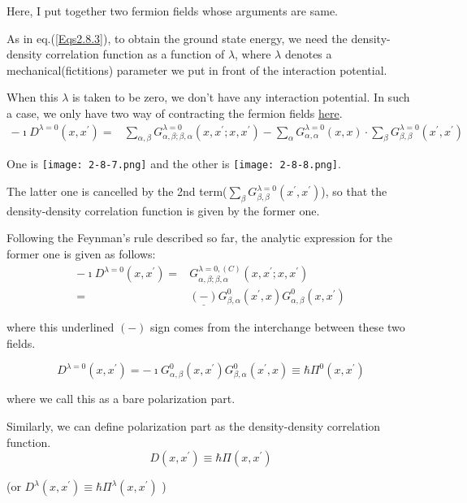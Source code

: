Here, I put together two fermion fields whose arguments are same.

As in eq.(\ref{Eqs2.8.3}), to obtain the ground state energy, we need the density-density correlation function as a function of $\lambda$, where $\lambda$ denotes a mechanical(fictitions) parameter we put in front of the interaction potential.

When this $\lambda$ is taken to be zero, we don't have any interaction potential. In such a case, we only have two way of contracting the fermion fields \underline{here}.
\[\begin{split}
-\imath D^{\lambda=0}(x,x^{'})=& \sum_{\alpha,\beta} G^{\lambda=0}_{\alpha,\beta;\beta,\alpha}(x,x^{'};x,x^{'}) - \sum_{\alpha}G^{\lambda=0}_{\alpha,\alpha}(x,x)\cdot\sum_{\beta}G^{\lambda=0}_{\beta,\beta}(x^{'},x^{'})
\end{split}\]

One is {\label{Fig2.8.7} \texttt{[image: 2-8-7.png]}} and the other is {\label{Fig2.8.8} \texttt{[image: 2-8-8.png]}}.

The latter one is cancelled by the 2nd term($\sum_{\beta} G^{\lambda=0}_{\beta,\beta}(x^{'},x^{'})$), so that the density-density correlation function is given by the former one.

Following the Feynman's rule described so far, the analytic expression for the former one is given as follows:
\[\begin{split}-\imath D^{\lambda=0}(x,x^{'})=&G^{\lambda=0,(C)}_{\alpha,\beta;\beta,\alpha}(x,x^{'};x,x^{'})\\
=& \underline{(-)} G^0_{\beta,\alpha}(x^{'},x) G^0_{\alpha,\beta}(x,x^{'})\end{split}\]

where this underlined $(-)$ sign comes from the interchange between these two fields.

\[D^{\lambda=0}(x,x^{'})=-\imath G^0_{\alpha,\beta}(x,x^{'}) G^0_{\beta,\alpha}(x^{'},x) \equiv \hbar \Pi^0(x,x^{'})\]

where we call this as a bare polarization part.

Similarly, we can define polarization part as the density-density correlation function.
\begin{equation*} \label{Eqs2.8.4'} \tag{2.8.4'}
D(x,x^{'}) \equiv \hbar \Pi(x,x^{'})
\end{equation*}

(or $D^{\lambda}(x,x^{'}) \equiv \hbar \Pi^{\lambda}(x,x^{'})$ )

